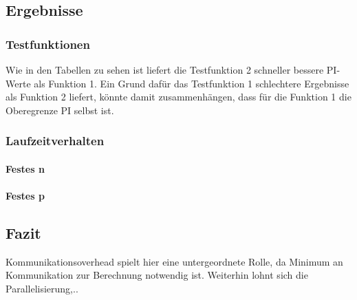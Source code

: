 \subsection{Ergebnisse}
\label{ref:ergebnisse}

\subsubsection{Testfunktionen}

Wie in den Tabellen zu sehen ist liefert die Testfunktion 2 schneller bessere PI-Werte als Funktion 1.
Ein Grund dafür das Testfunktion 1 schlechtere Ergebnisse als Funktion 2 liefert, könnte damit zusammenhängen, dass für die Funktion 1 die Oberegrenze PI selbst ist.

\subsubsection{Laufzeitverhalten}
\paragraph{Festes n}
\paragraph{Festes p}

\subsection{Fazit}
\label{ref:fazit}
Kommunikationsoverhead spielt hier eine untergeordnete Rolle, da Minimum an Kommunikation zur Berechnung notwendig ist.
Weiterhin lohnt sich die Parallelisierung,..


%
%


